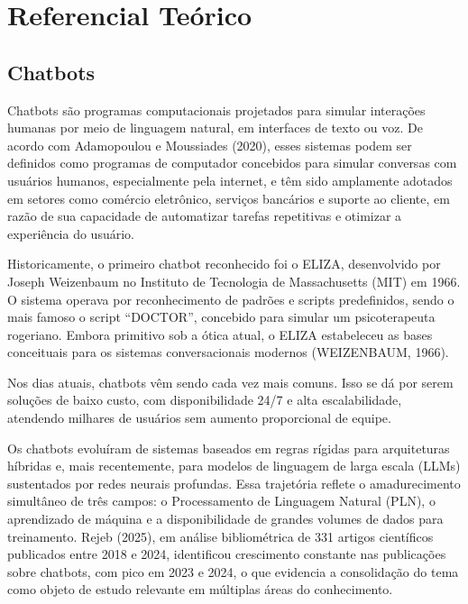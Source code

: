 \documentclass[12pt,a4paper]{extarticle}
\begin{document}
\newpage
\section{Referencial Teórico}
\label{cap:referencial}

\subsection{Chatbots}

Chatbots são programas computacionais projetados para simular interações humanas por meio de linguagem natural, em interfaces de texto ou voz. De acordo com Adamopoulou e Moussiades (2020), esses sistemas podem ser definidos como programas de computador concebidos para simular conversas com usuários humanos, especialmente pela internet, e têm sido amplamente adotados em setores como comércio eletrônico, serviços bancários e suporte ao cliente, em razão de sua capacidade de automatizar tarefas repetitivas e otimizar a experiência do usuário.

Historicamente, o primeiro chatbot reconhecido foi o ELIZA, desenvolvido por Joseph Weizenbaum no Instituto de Tecnologia de Massachusetts (MIT) em 1966. O sistema operava por reconhecimento de padrões e scripts predefinidos, sendo o mais famoso o script ``DOCTOR'', concebido para simular um psicoterapeuta rogeriano. Embora primitivo sob a ótica atual, o ELIZA estabeleceu as bases conceituais para os sistemas conversacionais modernos (WEIZENBAUM, 1966).

Nos dias atuais, chatbots vêm sendo cada vez mais comuns. Isso se dá por serem soluções de baixo custo, com disponibilidade 24/7 e alta escalabilidade, atendendo milhares de usuários sem aumento proporcional de equipe.

Os chatbots evoluíram de sistemas baseados em regras rígidas para arquiteturas híbridas e, mais recentemente, para modelos de linguagem de larga escala (LLMs) sustentados por redes neurais profundas. Essa trajetória reflete o amadurecimento simultâneo de três campos: o Processamento de Linguagem Natural (PLN), o aprendizado de máquina e a disponibilidade de grandes volumes de dados para treinamento. Rejeb (2025), em análise bibliométrica de 331 artigos científicos publicados entre 2018 e 2024, identificou crescimento constante nas publicações sobre chatbots, com pico em 2023 e 2024, o que evidencia a consolidação do tema como objeto de estudo relevante em múltiplas áreas do conhecimento.
\end{document}
